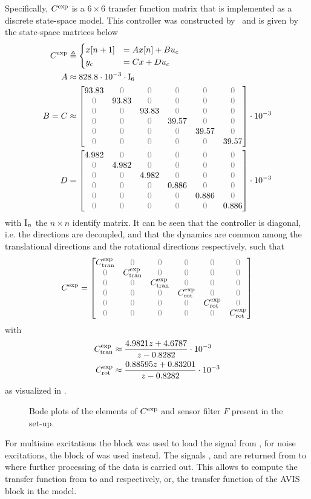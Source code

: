 Specifically, $C^{\mathrm{exp}}$ is a $6\times6$ transfer function matrix that is implemented as a discrete state-space model.
This controller was constructed by~\citet{Rademakers2005MSc}
 and is given by the state-space matrices below
\begin{align}
  \experimental\Controller & \isdef 
  \begin{cases}
     x[n+1] &= A x[n] + B u_c\\
       y_c    &= C x + D u_c 
  \end{cases}\\
  A       &\approx 828.8 \cdot 10^{-3} \cdot \Identity{6} \\
  B = C &\approx \AvisMatrixDiagonal{93.83}{39.57} \cdot 10^{-3}\\
  D       &= \AvisMatrixDiagonal{4.982}{0.886} \cdot 10^{-3}
\end{align}
with $\mathrm{I}_{n}$ the $n\times n$ identify matrix.
It can be seen that the controller is diagonal, i.e. the directions are decoupled, and that the dynamics are common among the translational directions and the rotational directions respectively, such that
\begin{equation}
  \experimental\Controller = 
  \AvisMatrixDiagonal{\experimental\Controller_{\mathrm{tran}}}{\experimental\Controller_{\mathrm{rot}}}
\end{equation}
with
\begin{align}
C^{\mathrm{exp}}_{\mathrm{tran}} &  \approx 
   \frac{4.9821 z + 4.6787}{ z - 0.8282} \cdot 10^{-3} \\
  C^{\mathrm{exp}}_{\mathrm{rot}} & \approx 
    \frac{0.88595 z + 0.83201}{ z - 0.8282} \cdot 10^{-3}
\end{align}
 as visualized in .

\begin{figure}[p]
\setlength{}
\setlength\figureheight{0.68\figurewidth}

\caption{Bode plots of the elements of $C^{\mathrm{exp}}$ and sensor filter $F$ present in the set-up.}
\label{fig:avis:bodeplots:controllerAndSensor}
\end{figure}

For multisine excitations the  block was used to load the  signal from \MATLAB, for noise excitations, the  block of \Simulink was used instead.
The signals ,  and  are returned from \Simulink to \MATLAB where further processing of the data is carried out.
This allows to compute the transfer function from  to  and  respectively, or, the transfer function of the \gls{AVIS} block in the \Simulink model.


